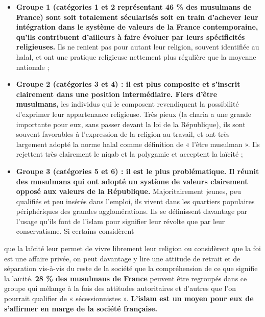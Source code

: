 \begin{itemize}
\item
  \textbf{Groupe 1 (catégories 1 et 2 représentant 46 \% des musulmans
  de France) sont soit totalement sécularisés soit en train d'achever
  leur intégration dans le système de valeurs de la France
  contemporaine, qu'ils contribuent d'ailleurs à faire évoluer par leurs
  spécificités religieuses.} Ils ne renient pas pour autant leur
  religion, souvent identifiée au halal, et ont une pratique religieuse
  nettement plus régulière que la moyenne nationale ;
\item
  \textbf{Groupe 2 (catégories 3 et 4) : il est plus composite et
  s'inscrit clairement dans une position intermédiaire. Fiers d'être
  musulmans,} les individus qui le composent revendiquent la possibilité
  d'exprimer leur appartenance religieuse. Très pieux (la charia a une
  grande importante pour eux, sans passer devant la loi de la
  République), ils sont souvent favorables à l'expression de la religion
  au travail, et ont très largement adopté la norme halal comme
  définition de « l'être musulman ». Ils rejettent très clairement le
  niqab et la polygamie et acceptent la laïcité ;
\item
  \textbf{Groupe 3 (catégories 5 et 6) : il est le plus problématique.
  Il réunit des musulmans qui ont adopté un système de valeurs
  clairement opposé aux valeurs de la République.} Majoritairement
  jeunes, peu qualifiés et peu insérés dans l'emploi, ils vivent dans
  les quartiers populaires périphériques des grandes agglomérations. Ils
  se définissent davantage par l'usage qu'ils font de l'islam pour
  signifier leur révolte que par leur conservatisme. Si certains
  considèrent
\end{itemize}




que la laïcité leur permet de vivre librement leur religion ou
considèrent que la foi est une affaire privée, on peut davantage y
lire une attitude de retrait et de séparation vis-à-vis du reste de la
société que la compréhension de ce que signifie la laïcité. \textbf{28
\% des musulmans de France} peuvent être regroupés dans ce groupe qui
mélange à la fois des attitudes autoritaires et d'autres que l'on
pourrait qualifier de « sécessionnistes ». \textbf{L'islam est un moyen
pour eux de s'affirmer en marge de la société française.}


